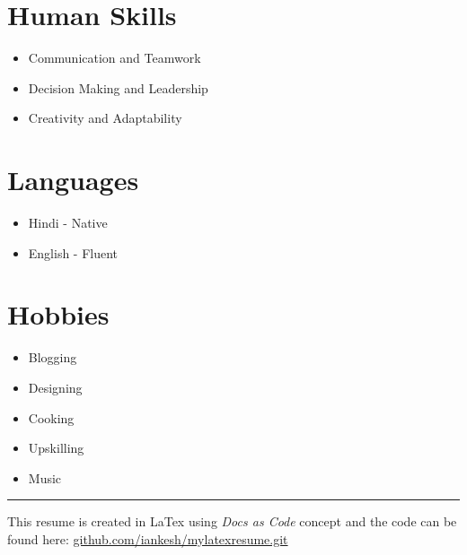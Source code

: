 \documentclass[11pt, a4paper]{article}
\begin{document}
\section*{Human Skills}
\begin{itemize}[noitemsep, nolistsep]
\item Communication and Teamwork
\item Decision Making and Leadership
\item Creativity and Adaptability
\end{itemize}

\section*{Languages}
\begin{itemize}[noitemsep, nolistsep]
\item Hindi - Native
\item English - Fluent
\end{itemize}

\section*{Hobbies}
\begin{itemize}[noitemsep, nolistsep]
\item Blogging
\item Designing
\item Cooking
\item Upskilling
\item Music
\end{itemize}
\begin{center}%
\rule{7in}{0.3mm}
\scriptsize This resume is created in LaTex using \textit{Docs as Code} concept and the code can be found here: \url{github.com/iankesh/mylatexresume.git}
\end{center}


\pagebreak
\end{document}
